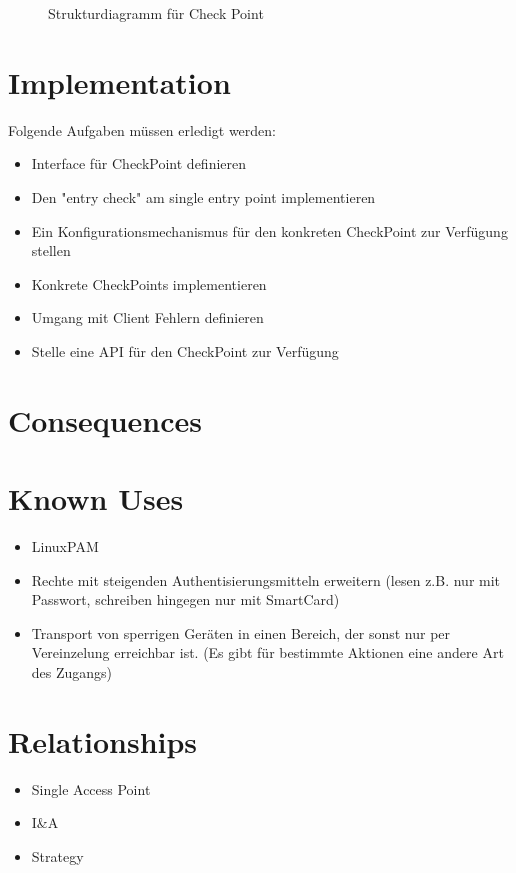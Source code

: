 \begin{figure}[H]
  \centering
  
  \caption{Strukturdiagramm f\"ur Check Point}
\end{figure}

\section{Implementation}
Folgende Aufgaben müssen erledigt werden:

\begin{itemize}
  \item Interface für CheckPoint definieren
  \item Den "entry check" am single entry point implementieren
  \item Ein Konfigurationsmechanismus für den konkreten CheckPoint zur Verfügung stellen
  \item Konkrete CheckPoints implementieren
  \item Umgang mit Client Fehlern definieren
  \item Stelle eine API für den CheckPoint zur Verfügung
\end{itemize}

\section{Consequences}
\begin{itemize}
\end{itemize}

\section{Known Uses}
\begin{itemize}
  \item LinuxPAM
  \item Rechte mit steigenden Authentisierungsmitteln erweitern (lesen z.B. nur mit Passwort, schreiben hingegen nur mit SmartCard)
  \item Transport von sperrigen Geräten in einen Bereich, der sonst nur per Vereinzelung erreichbar ist. (Es gibt für bestimmte Aktionen eine andere Art des Zugangs)
\end{itemize}

\section{Relationships}
\begin{itemize}
  \item Single Access Point
  \item I\&A
  \item Strategy
\end{itemize}


